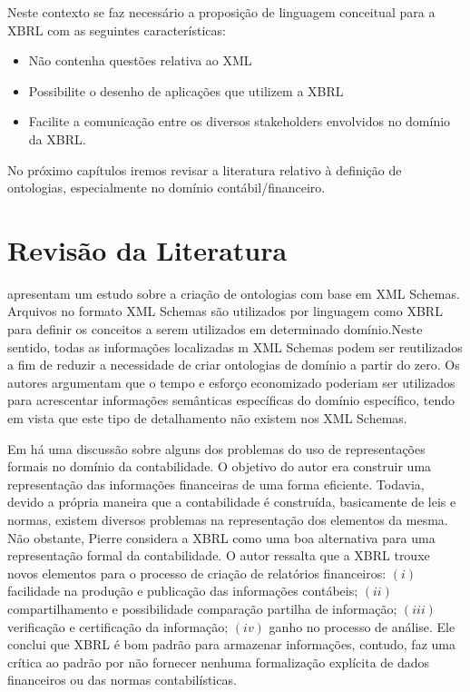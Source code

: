 \documentclass[msc,proposal,hidelot,hideabstract]{ppgccufmg} %
\begin{document}
Neste contexto se faz necessário a proposição de linguagem conceitual para a XBRL com as seguintes características:
 \begin{itemize}
 	\item Não contenha questões relativa ao XML
 	\item Possibilite o desenho de aplicações que utilizem a XBRL
 	\item Facilite a comunicação entre os diversos stakeholders envolvidos no domínio da XBRL.
 \end{itemize}
 
No próximo capítulos iremos revisar a literatura relativo à definição de ontologias, especialmente no domínio contábil/financeiro.

\chapter{Revisão da Literatura}
\label{ch:revisao}

\cite{Bosch:2013:APD:2575980.2575988} apresentam um estudo sobre a criação de ontologias com base em XML Schemas. Arquivos no formato XML Schemas são utilizados por linguagem como XBRL para definir os conceitos a serem utilizados em determinado domínio.Neste sentido, todas as informações localizadas m XML Schemas podem ser reutilizados a fim de reduzir a necessidade de criar ontologias de domínio a partir do zero. Os autores argumentam que o tempo e esforço economizado poderiam ser utilizados para acrescentar informações semânticas específicas do domínio específico, tendo em vista que este tipo de detalhamento não existem nos XML Schemas.

Em \cite{journals/ijcsa/Pierre08} há uma discussão sobre alguns dos problemas do uso de representações formais no domínio da contabilidade. O objetivo do autor era construir uma representação das informações financeiras de uma forma eficiente. Todavia, devido a própria maneira que a contabilidade é construída, basicamente de leis e normas, existem diversos problemas na representação dos elementos da mesma. Não obstante, Pierre considera a XBRL como uma boa alternativa para uma representação formal da contabilidade. O autor ressalta que a XBRL trouxe novos elementos para o processo de criação de relatórios financeiros: $(i)$ facilidade na produção e publicação das informações contábeis; $(ii)$ compartilhamento e possibilidade comparação partilha de informação; $(iii)$ verificação e certificação da informação; $(iv)$ ganho no processo de análise. Ele conclui que XBRL é bom padrão para armazenar informações, contudo, faz uma crítica ao padrão por não fornecer nenhuma formalização explícita de dados financeiros ou das normas contabilísticas.
\end{document}
